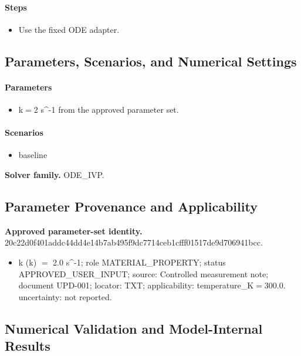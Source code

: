 \documentclass[11pt]{article}
\begin{document}
\paragraph{Steps}
\begin{itemize}
\item Use the fixed ODE adapter.
\end{itemize}

\subsection{Parameters, Scenarios, and Numerical Settings}

\paragraph{Parameters}
\begin{itemize}
\item k\ensuremath{=}2 s\textasciicircum{}-1 from the approved parameter set.
\end{itemize}

\paragraph{Scenarios}
\begin{itemize}
\item baseline
\end{itemize}

\noindent\textbf{Solver family.} ODE\_IVP.

\subsection{Parameter Provenance and Applicability}

\noindent\textbf{Approved parameter-set identity.} 20c22d0f401addc44dd4e14b7ab495f9dc7714ceb1cfff01517de9d706941bcc.
\begin{itemize}
\item k (k) \ensuremath{=} 2.0 s\textasciicircum{}-1; role MATERIAL\_PROPERTY; status APPROVED\_USER\_INPUT; source: Controlled measurement note; document UPD-001; locator: TXT; applicability: temperature\_K\ensuremath{=}300.0. uncertainty: not reported.
\end{itemize}

\subsection{Numerical Validation and Model-Internal Results}
\end{document}
